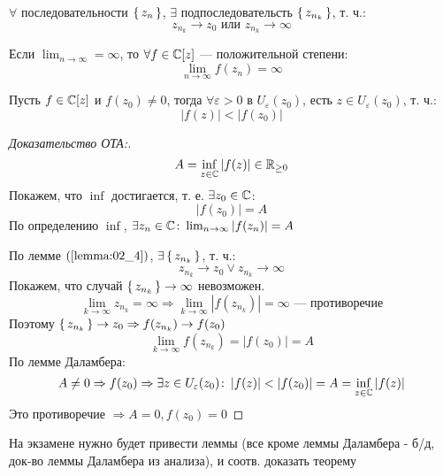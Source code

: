 \begin{lemma}
 \label{lemma:02_4}
 $\forall$ последовательности $\set{z_n}$, $\exists$ подпоследовательсть $\set{z_{n_k}}$, т. ч.:
 \[
  z_{n_k} \rightarrow z_0 \text{ или } z_{n_k} \rightarrow \infty
 \]
\end{lemma}
\begin{lemma}
  \label{lemma:02_5}
  Если $\lim_{n\to \infty} = \infty$, то $\forall f \in \mathbb{C}[z]$ --- положительной степени:
  \[
    \lim_{n\to \infty} f(z_n) = \infty
  \]
\end{lemma}
\begin{lemma}[Даламбер]
  \label{lemma:02_6}
  Пусть $f \in \mathbb{C}[z]$ и $f(z_0) \neq 0$, тогда $\forall \varepsilon > 0$ в $U_{\varepsilon}(z_0)$, есть $z \in U_{\varepsilon}(z_0)$, т. ч.:
  \[
    \left|f(z)\right| < \left|f(z_0)\right|
  \]
\end{lemma}
\begin{proof}[Доказательство ОТА:]
  \[
  A = \underset{z \in \mathbb{C}}{\inf} \left|f(z)\right| \in \mathbb{R}_{\geq 0}
  \]
  Покажем, что $\inf$ достигается, т. е. $\exists z_0 \in \mathbb{C}$:
  \[
  \left|f(z_0)\right| = A
  \]
  По определению $\inf$, $\exists z_n \in \mathbb{C} \colon \lim_{n\to \infty} \left|f(z_n)\right| = A$ 

  По лемме $(\ref{lemma:02_4})$, $\exists \set{z_{n_k}}$, т. ч.:
  \[
    z_{n_k} \rightarrow z_0 \lor z_{n_k} \rightarrow \infty
  \]
  Покажем, что случай $\set{z_{n_k}} \rightarrow \infty$ невозможен.
  \[
    \lim_{k \to \infty} z_{n_k} = \infty \Rightarrow \lim_{k\to \infty} \left|f(z_{n_k})\right| = \infty \text{ --- противоречие}
  \]
  Поэтому $\set{z_{n_k}} \rightarrow z_0 \Rightarrow f(z_{n_k}) \rightarrow f(z_0)$
  \[
  \lim_{k\to \infty} f(z_{n_k}) = \left|f(z_0)\right| = A
  \]
  По лемме Даламбера:
  \[
  A \neq 0 \Rightarrow f(z_0) \Rightarrow \exists z \in U_{\varepsilon}(z_0)\colon \left|f(z)\right| < \left|f(z_0)\right| = A = \underset{z \in \mathbb{C}}{\inf} \left|f(z)\right|
  \]
  Это противоречие $\Rightarrow A = 0, f(z_0) = 0$
\end{proof}
\begin{note}
На экзамене нужно будет привести леммы (все кроме леммы Даламбера - б/д, док-во леммы Даламбера из анализа), и соотв. доказать теорему
\end{note}
